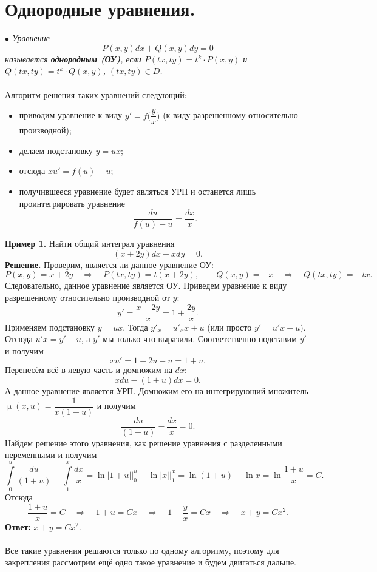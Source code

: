 \documentclass[a4paper, 12pt]{article}
\renewcommand{\mu}{\upmu}
\renewcommand{\mu}{\upmu}
\begin{document}
	\section*{Однородные уравнения.}
	$\bullet$ \textit{Уравнение $$P(x,y)dx + Q(x,y)dy = 0$$
	называется \textbf{однородным (ОУ)}, если $P(tx,ty) = t^k\cdot P(x,y)$ и $Q(tx,ty) = t^k\cdot  Q(x,y)$, $(tx,ty)\in D$.}\\\\
Алгоритм решения таких уравнений следующий: \begin{itemize}
	\item приводим уравнение к виду $y' = f\Big(\dfrac{y}{x}\Big)$ (к виду разрешенному относительно производной);
	\item делаем подстановку $y = ux$;
	\item отсюда $xu' = f(u) - u$;
	\item получившееся уравнение будет являться УРП и останется лишь проинтегрировать уравнение $$\dfrac{du}{f(u) - u} = \dfrac{dx}{x}.$$
\end{itemize}
\textbf{Пример 1.} Найти общий интеграл уравнения $$(x + 2y)dx - xdy = 0.$$
\textbf{Решение.} Проверим, является ли данное уравнение ОУ: $$P(x,y) = x+2y \quad \Rightarrow\quad P(tx,ty) = t(x + 2y),\qquad Q(x,y) = -x\quad \Rightarrow\quad Q(tx,ty) = -tx.$$
Следовательно, данное уравнение является ОУ. Приведем уравнение к виду разрешенному относительно производной от $y$:
$$y' = \dfrac{x + 2y}{x} = 1 + \dfrac{2y}{x}.$$
Применяем подстановку $y = ux$. Тогда $y'_x = u'_x x + u$ (или просто $y' = u'x + u$). Отсюда $u'x = y' - u$, а $y'$ мы только что выразили. Соответственно подставим $y'$ и получим $$xu' = 1 + 2u - u = 1 + u.$$
Перенесём всё в левую часть и домножим на $dx$:
$$xdu - (1+u)dx = 0.$$
А данное уравнение является УРП. Домножим его на интегрирующий множитель $\mu(x,u) = \dfrac{1}{x(1+u)}$ и получим $$\dfrac{du}{(1+u)} - \dfrac{dx}{x} = 0.$$
Найдем решение этого уравнения, как решение уравнения с разделенными переменными и получим $$\int\limits_{0}^u\dfrac{du}{(1+u)} - \int\limits_{1}^x\dfrac{dx}{x} = \ln |1+u|\Big|_{0}^u -\ln |x|\Big|_{1}^x  = \ln(1+u) - \ln x = \ln\dfrac{1+u}{x} = C.$$
Отсюда $$\dfrac{1 + u}{x} = C \quad \Rightarrow\quad 1+u = Cx \quad\Rightarrow\quad 1 + \dfrac{y}{x}= Cx \quad\Rightarrow\quad x + y = Cx^2.$$
\textbf{Ответ:} $x+y = Cx^2$.\\\\
Все такие уравнения решаются только по одному алгоритму, поэтому для закрепления рассмотрим ещё одно такое уравнение и будем двигаться дальше.\\\\
\end{document}
